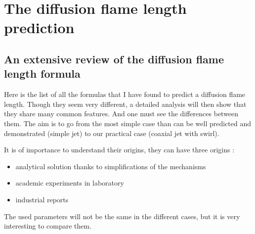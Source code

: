 \renewcommand\evenpagerightmark{{\scshape\small The diffusion flame length prediction}}
\chapter[The diffusion flame length prediction]%
{The diffusion flame length prediction}
\label{The diffusion flame length prediction}
\section{An extensive review of the diffusion flame length formula }

Here is the list of all the formulas that I have found to predict a diffusion flame length. Though they seem very different, a detailed analysis will then show that they share many common features. And one must see the differences between them. The aim is to go from the most simple case than can be well predicted and demonstrated (simple jet) to our practical case (coaxial jet with swirl).

It is of importance to understand their origins, they can have three origins :
\begin{itemize}
\item analytical solution thanks to simplifications of the mechanisms
\item academic experiments in laboratory
\item industrial reports 
\end{itemize}

The used parameters will not be the same in the different cases, but it is very interesting to compare them.



